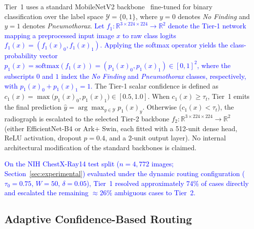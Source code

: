 \documentclass[diagnostics,article,submit,moreauthors]{Definitions/mdpi}
\newcommand{\rev}[1]{\textcolor{blue}{#1}}
\begin{document}
Tier~1 uses a standard MobileNetV2 backbone~\cite{sandler2018mobilenetv2} fine-tuned for binary classification over the label space $\mathcal{Y} = \{0, 1\}$, where $y=0$ denotes \emph{No Finding} and $y=1$ denotes \emph{Pneumothorax}. \rev{Let $f_1 : \mathbb{R}^{3\times 224\times 224} \to \mathbb{R}^2$ denote the Tier-1 network mapping a preprocessed input image $x$ to raw class logits $f_1(x) = (f_1(x)_0, f_1(x)_1)$. Applying the softmax operator yields the class-probability vector $p_1(x) = \mathrm{softmax}(f_1(x)) = (p_1(x)_0, p_1(x)_1) \in [0,1]^2$, where the subscripts $0$ and $1$ index the \emph{No Finding} and \emph{Pneumothorax} classes, respectively, with $p_1(x)_0 + p_1(x)_1 = 1$.} The Tier-1 scalar confidence is defined as $c_1(x) = \max\big(p_1(x)_0, p_1(x)_1\big) \in [0.5, 1.0]$. When $c_1(x) \ge \tau_t$, Tier~1 emits the final prediction $\hat{y} = \arg\max_{y\in\mathcal{Y}} p_1(x)_y$. Otherwise ($c_1(x) < \tau_t$), the radiograph is escalated to the selected Tier-2 backbone $f_2 : \mathbb{R}^{3\times 224\times 224} \to \mathbb{R}^2$ (either EfficientNet-B4 or Ark+ Swin, each fitted with a 512-unit dense head, ReLU activation, dropout $p=0.4$, and a 2-unit output layer). No internal architectural modification of the standard backbones is claimed.

\rev{On the NIH ChestX-Ray14 test split ($n=4{,}772$ images; Section~\ref{sec:experimental}) evaluated under the dynamic routing configuration ($\tau_0=0.75$, $W=50$, $\delta=0.05$), Tier~1 resolved approximately 74\% of cases directly and escalated the remaining $\approx 26\%$ ambiguous cases to Tier~2.}

\subsection{Adaptive Confidence-Based Routing}
\end{document}
